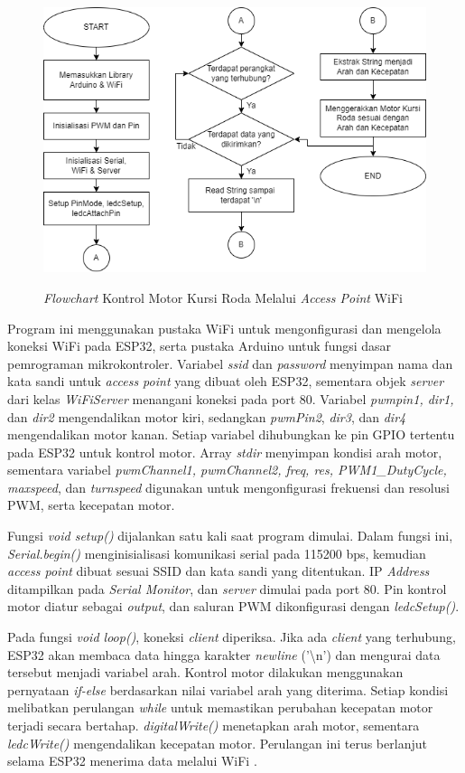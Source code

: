 \begin{figure}[H]
\centering
\includegraphics[scale=0.5]{gambar/bab3/8. Kontrol Motor WiFi.png}
\caption{\emph{Flowchart} Kontrol Motor Kursi Roda Melalui \emph{Access Point} WiFi}
\label{fig:Flowchart 8 Kontrol WiFi}
\parencite{ekatama2024perancangan}
\end{figure}

Program ini menggunakan pustaka WiFi untuk mengonfigurasi dan mengelola koneksi WiFi pada ESP32, serta pustaka Arduino untuk fungsi dasar pemrograman mikrokontroler. Variabel \emph{ssid} dan \emph{password} menyimpan nama dan kata sandi untuk \emph{access point} yang dibuat oleh ESP32, sementara objek \emph{server} dari kelas \emph{WiFiServer} menangani koneksi pada port 80. Variabel \emph{pwmpin1, dir1,} dan \emph{dir2} mengendalikan motor kiri, sedangkan \emph{pwmPin2}, \emph{dir3}, dan \emph{dir4} mengendalikan motor kanan. Setiap variabel dihubungkan ke pin GPIO tertentu pada ESP32 untuk kontrol motor. Array \emph{stdir} menyimpan kondisi arah motor, sementara variabel \emph{pwmChannel1, pwmChannel2, freq, res, PWM1\_DutyCycle, maxspeed}, dan \emph{turnspeed} digunakan untuk mengonfigurasi frekuensi dan resolusi PWM, serta kecepatan motor.

Fungsi \emph{void setup()} dijalankan satu kali saat program dimulai. Dalam fungsi ini, \emph{Serial.begin()} menginisialisasi komunikasi serial pada 115200 bps, kemudian \emph{access point} dibuat sesuai SSID dan kata sandi yang ditentukan. IP \emph{Address} ditampilkan pada \emph{Serial Monitor}, dan \emph{server} dimulai pada port 80. Pin kontrol motor diatur sebagai \emph{output}, dan saluran PWM dikonfigurasi dengan \emph{ledcSetup()}.

Pada fungsi \emph{void loop()}, koneksi \emph{client} diperiksa. Jika ada \emph{client} yang terhubung, ESP32 akan membaca data hingga karakter \emph{newline} ('\textbackslash n') dan mengurai data tersebut menjadi variabel arah. Kontrol motor dilakukan menggunakan pernyataan \emph{if-else} berdasarkan nilai variabel arah yang diterima. Setiap kondisi melibatkan perulangan \emph{while} untuk memastikan perubahan kecepatan motor terjadi secara bertahap. \emph{digitalWrite()} menetapkan arah motor, sementara \emph{ledcWrite()} mengendalikan kecepatan motor. Perulangan ini terus berlanjut selama ESP32 menerima data melalui WiFi \parencite{ekatama2024perancangan}.